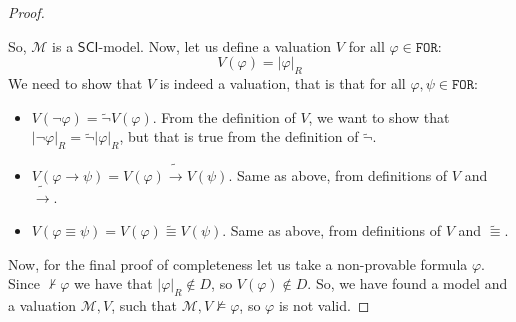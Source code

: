 \documentclass{article}
\theoremstyle{definition}
\theoremstyle{definition}
\theoremstyle{definition}
\newcommand*{\id}{\equiv}
\newcommand*{\ra}{\rightarrow}
\newcommand*{\FOR}{\texttt{FOR}}
\newcommand{\SCI}{$\mathsf{SCI}$\xspace}
\begin{document}
\begin{proof}
\begin{itemize}
    \end{itemize}
    So, $\mathcal{M}$ is a \SCI-model. Now, let us define a valuation $V$ for all
    $\varphi \in \FOR$: $$ V(\varphi) = |\varphi|_R $$
    We need to show that $V$ is indeed a valuation, that is that for all $\varphi,
        \psi \in \FOR$:
    \begin{itemize}
        \item $V(\lnot \varphi) = \tilde{\lnot}V(\varphi)$. From the definition of $V$, we want to show that $|\lnot \varphi|_R = \tilde{\lnot}|\varphi|_R$, but that is true from the definition of $\tilde{\lnot}$.
        \item $V(\varphi \ra \psi) = V(\varphi) \tilde{\ra} V(\psi)$. Same as above, from definitions of $V$ and $\tilde{\ra}$.
        \item $V(\varphi \id \psi) = V(\varphi) \tilde{\id} V(\psi)$. Same as above, from definitions of $V$ and $\tilde{\id}$.
    \end{itemize}
    Now, for the final proof of completeness let us take a non-provable formula
    $\varphi$. Since $\not \vdash \varphi$ we have that $|\varphi|_R \not \in D$,
    so $V(\varphi) \not \in D$. So, we have found a model and a valuation
    $\mathcal{M},V$, such that $\mathcal{M},V \not \models \varphi$, so $\varphi$
    is not valid.
\end{proof}
\end{document}
